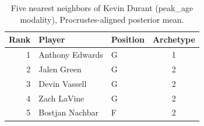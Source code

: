 \begin{table}[htbp]
  \centering\small
  \begin{tabular}{rllc}
    \toprule
    Rank & Player & Position & Archetype \\
    \midrule
    1 & Anthony Edwards & G & 1 \\
    2 & Jalen Green & G & 2 \\
    3 & Devin Vassell & G & 2 \\
    4 & Zach LaVine & G & 2 \\
    5 & Bostjan Nachbar & F & 2 \\
    \bottomrule
  \end{tabular}
  \caption{Five nearest neighbors of Kevin Durant (peak_age modality), Procrustes-aligned posterior mean.}
  \label{tab:Kevin_Durant_neighbors_peak_age}
\end{table}

